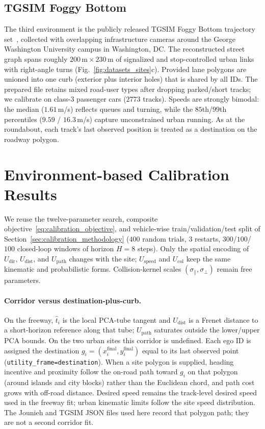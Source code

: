 \documentclass[conference]{IEEEtran}
\begin{document}
\subsection{TGSIM Foggy Bottom}
The third environment is the publicly released TGSIM Foggy Bottom trajectory set~\cite{talebpour2024tgsim,fhwa2024tgsimfb}, collected with overlapping infrastructure cameras around the George Washington University campus in Washington, DC. The reconstructed street graph spans roughly $200\,\mathrm{m}\times 230\,\mathrm{m}$ of signalized and stop-controlled urban links with right-angle turns (Fig.~\ref{fig:datasets_sites}c). Provided lane polygons are unioned into one curb (exterior plus interior holes) that is shared by all IDs. The prepared file retains mixed road-user types after dropping parked/short tracks; we calibrate on class-$3$ passenger cars ($2773$ tracks). Speeds are strongly bimodal: the median ($1.61$\,m/s) reflects queues and turning, while the $85$th/$99$th percentiles ($9.59$ / $16.3$\,m/s) capture unconstrained urban running. As at the roundabout, each track's last observed position is treated as a destination on the roadway polygon.

\section{Environment-based Calibration Results}
\label{app:env_calib}

We reuse the twelve-parameter search, composite objective~\eqref{eq:calibration_objective}, and vehicle-wise train/validation/test split of Section~\ref{sec:calibration_methodology} ($400$ random trials, $3$ restarts, $300$/$100$/$100$ closed-loop windows of horizon $H=8$ steps). Only the spatial encoding of $U_{\mathrm{dir}}$, $U_{\mathrm{dist}}$, and $U_{\mathrm{path}}$ changes with the site; $U_{\mathrm{speed}}$ and $U_{\mathrm{col}}$ keep the same kinematic and probabilistic forms. Collision-kernel scales $(\sigma_{\parallel},\sigma_{\perp})$ remain free parameters.

\paragraph{Corridor versus destination-plus-curb.}
On the freeway, $\hat{t}_{i}$ is the local PCA-tube tangent and $U_{\mathrm{dist}}$ is a Frenet distance to a short-horizon reference along that tube; $U_{\mathrm{path}}$ saturates outside the lower/upper PCA bounds. On the two urban sites this corridor is undefined. Each ego ID is assigned the destination $g_{i}=(x_{i}^{\mathrm{final}},y_{i}^{\mathrm{final}})$ equal to its last observed point (\texttt{utility\_frame=destination}). When a site polygon is supplied, heading incentive and proximity follow the on-road path toward $g_{i}$ on that polygon (around islands and city blocks) rather than the Euclidean chord, and path cost grows with off-road distance. Desired speed remains the track-level desired speed used in the freeway fit; urban kinematic limits follow the site speed distribution. The Jounieh and TGSIM JSON files used here record that polygon path; they are not a second corridor fit.
\end{document}
